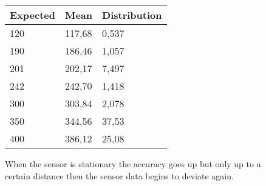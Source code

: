 \begin{figure}
    \begin{center}
        \small
        \begin{tabular}{ l | l | l }
            Expected&Mean&Distribution\\
        \hline
            120& 117,68 & 0,537\\
            190& 186,46 & 1,057\\
            201& 202,17 & 7,497\\
            242& 242,70 & 1,418\\
            300& 303,84 & 2,078\\
            350& 344,56 & 37,53\\
            400& 386,12 & 25,08
        \end{tabular}
    \end{center}
    \caption{When the sensor is stationary the accuracy goes up but only up to a certain distance then the sensor data begins to deviate again.}
    \label{table:static}
\end{figure}
